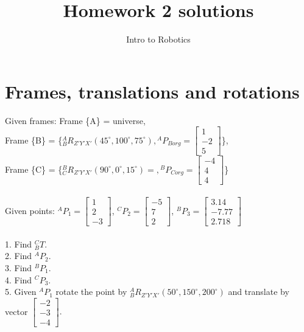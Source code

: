 \documentclass{article}
\title{Homework 2 solutions}
\author{Intro to Robotics}
\date{}
\begin{document}
\maketitle

\section{Frames, translations and rotations}
Given frames: Frame \{A\} = universe,\\ 
Frame \{B\} = \{${}^{A}_{B}R_{Z'Y'X'}(45^\circ, 100^\circ, 75^\circ),{}^{A}P_{Borg}=\begin{bmatrix}
1  \\
-2 \\
5
\end{bmatrix} $\},\\
Frame \{C\} = \{${}^{B}_{C}R_{Z'Y'X'}(90^\circ, 0^\circ, 15^\circ)= ,{}^{B}P_{Corg}=\begin{bmatrix}
-4  \\
4 \\
4
\end{bmatrix} $\}\\\\
Given points: ${}^{A}P_{1}=\begin{bmatrix}
1  \\
2 \\
-3
\end{bmatrix}$, ${}^{C}P_{2}=\begin{bmatrix}
-5  \\
7 \\
2
\end{bmatrix}$, ${}^{B}P_{3}=\begin{bmatrix}
3.14  \\
-7.77 \\
2.718
\end{bmatrix}$\\\\
1. Find $^C_BT$.\\
2. Find ${}^{A}P_{2}$.\\
3. Find ${}^{B}P_{1}$.\\
4. Find ${}^{C}P_{3}$. \\
5. Given ${}^{A}P_{1}$ rotate the point by ${}^{A}_{B}R_{Z'Y'X'}(50^\circ, 150^\circ, 200^\circ)$ and translate by vector 
$\begin{bmatrix}
-2  \\
-3  \\
-4
\end{bmatrix}.$\\\\
\end{document}
